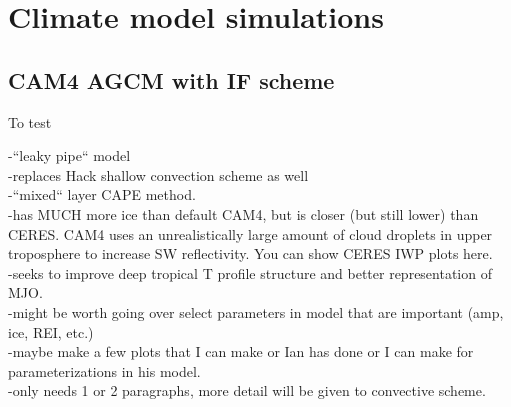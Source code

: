 \documentclass[letterpaper,12pt,titlepage,oneside,final]{book}
\begin{document}
\chapter{Climate model simulations}
\section{CAM4 AGCM with IF scheme}

To test 

-``leaky pipe`` model
\\
-replaces Hack shallow convection scheme as well
\\
-``mixed`` layer CAPE method.
\\
-has MUCH more ice than default CAM4, but is closer (but still lower) than CERES. CAM4 uses an unrealistically large amount of cloud droplets in upper troposphere to increase SW reflectivity. You can show CERES IWP plots here.
\\
-seeks to improve deep tropical T profile structure and better representation of MJO.
\\
-might be worth going over select parameters in model that are important (amp, ice, REI, etc.)
\\
-maybe make a few plots that I can make or Ian has done or I can make for parameterizations in his model.
\\

-only needs 1 or 2 paragraphs, more detail will be given to convective scheme.
\end{document}
